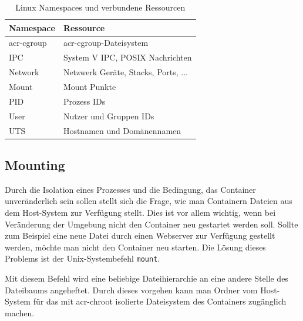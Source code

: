 \begin{table}[h]
	\begin{center}
		\begin{tabular}{ll}
			\toprule
			Namespace			& Ressource				 				\\
			\midrule
			\Gls{acr-cgroup}	& \Gls{acr-cgroup}-Dateisystem 			\\
			IPC					& System V IPC, POSIX Nachrichten 		\\
			Network				& Netzwerk Geräte, Stacks, Ports, ...	\\
			Mount				& Mount Punkte							\\
			PID					& Prozess IDs							\\
			User				& Nutzer und Gruppen IDs				\\
			UTS					& Hostnamen und Domänennamen			\\
			\bottomrule
		\end{tabular}
	\end{center}
	\caption{Linux Namespaces und verbundene Ressourcen \citep{Namespaces7LinuxManualPage}}
	\label{tab:namespaces}
\end{table}

\subsection{Mounting}
\label{sec:mount}
Durch die Isolation eines Prozesses und die Bedingung, das Container unveränderlich sein sollen stellt sich die Frage, wie man Containern Dateien aus dem Host-System zur Verfügung stellt. Dies ist vor allem wichtig, wenn bei Veränderung der Umgebung nicht den Container neu gestartet werden soll. Sollte zum Beispiel eine neue Datei durch einen Webserver zur Verfügung gestellt werden, möchte man nicht den Container neu starten. Die Lösung dieses Problems ist der Unix-Systembefehl \texttt{mount}. 

Mit diesem Befehl wird eine beliebige Dateihierarchie an eine andere Stelle des Dateibaums angeheftet. Durch dieses vorgehen kann man Ordner vom Host-System  für das mit \gls{acr-chroot} isolierte Dateisystem des Containers zugänglich machen.


